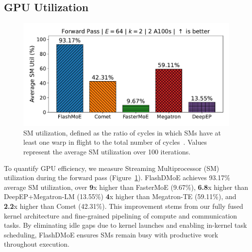 \subsection{GPU Utilization}\label{subsec:gpu-utilization}

\begin{figure}
    \vspace{-10pt}
    \centering
    \includegraphics[width=0.9\linewidth, keepaspectratio]{flash_figs/sm_util}
    \caption{SM utilization, defined as the ratio of cycles in which SMs
    have at least one warp in flight
    to the total number of cycles~\cite{nsight-metrics}.
    Values represent the average SM utilization over 100 iterations.}
    \label{fig:smu}
\end{figure}
To quantify GPU efficiency, we measure Streaming Multiprocessor (SM) utilization during the forward pass (Figure~\ref{fig:smu}).
FlashDMoE achieves 93.17\% average SM utilization,
over \textbf{9}x higher than FasterMoE (9.67\%), \textbf{6.8}x higher than DeepEP+Megatron-LM (13.55\%)
\textbf{4}x higher than Megatron-TE (59.11\%), and
\textbf{2.2}x higher than Comet (42.31\%).
This improvement stems from our fully fused kernel architecture and
fine-grained pipelining of compute and communication tasks.
By eliminating idle gaps due to kernel launches and enabling in-kernel task scheduling,
FlashDMoE ensures SMs remain busy with productive work throughout execution.

